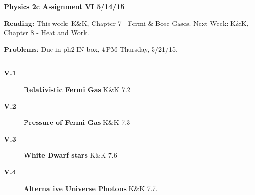 \documentclass[11pt]{article}
\def\hb{\hfill\break}
\begin{document}
%
\centerline{\large\bf Physics 2c \hfill Assignment VI \hfill  5/14/15}

\medskip
\begin{list}{}{\leftmargin 2.4cm  .2cm }
\item[{\bf Reading:}  \hfill ] This week: K\&K, Chapter 7 - Fermi \& Bose Gases. \hb
                               Next Week:      K\&K, Chapter 8 - Heat and Work.
\item[{\bf Problems:} \hfill ] Due in ph2 IN box, 4\,PM  Thursday, 5/21/15.
\end{list}

\hrule

\begin{description}
\item[{\bf V.1}] {\bf Relativistic Fermi Gas} K\&K 7.2 \\

\item[{\bf V.2}] {\bf Pressure of Fermi Gas} K\&K 7.3 \\

\item[{\bf V.3}] {\bf White Dwarf stars} K\&K 7.6\\

\item[{\bf V.4}] {\bf Alternative Universe Photons} K\&K 7.7. \\



\end{description}
\end{document}
